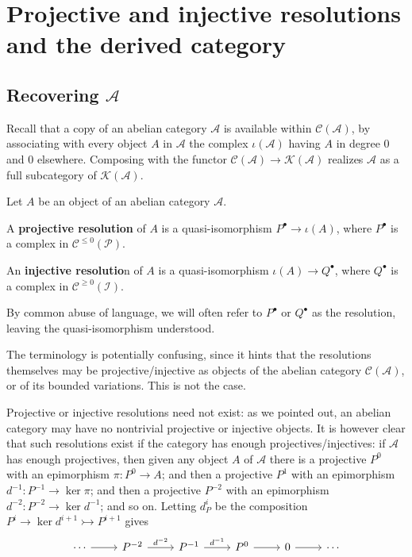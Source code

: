 \section{Projective and injective resolutions and the derived category}
\subsection{Recovering $\mathcal{A}$}
Recall that a copy of an abelian category $\mathcal{A}$ is available within $\mathcal{C}(\mathcal{A})$, by associating with every object $A$ in $\mathcal{A}$ the complex $\iota(\mathcal{A})$ having $A$ in degree $0$ and $0$ elsewhere. Composing with the functor $\mathcal{C}(\mathcal{A})\to\mathcal{K}(\mathcal{A})$ realizes $\mathcal{A}$ as a full subcategory of $\mathcal{K}(\mathcal{A})$.
\begin{definition}
Let $A$ be an object of an abelian category $\mathcal{A}$.\par
A \textbf{projective resolution} of $A$ is a quasi-isomorphism $P^\bullet\to\iota(A)$, where $P^\bullet$ is a
complex in $\mathcal{C}^{\leq0}(\mathcal{P})$.\par
An \textbf{injective resolutio}n of $A$ is a quasi-isomorphism $\iota(A)\to Q^\bullet$, where $Q^\bullet$ is a
complex in $\mathcal{C}^{\geq0}(\mathcal{I})$.
\end{definition}
By common abuse of language, we will often refer to $P^\bullet$ or $Q^\bullet$ as the resolution, leaving the quasi-isomorphism understood.
\begin{remark}
The terminology is potentially confusing, since it hints that the resolutions themselves may be projective/injective as objects of the abelian category $\mathcal{C}(\mathcal{A})$, or of its bounded variations. This is not the case.
\end{remark}
Projective or injective resolutions need not exist: as we pointed out, an abelian category may have no nontrivial projective or injective objects. It is however clear that such resolutions exist if the category has enough projectives/injectives: if $\mathcal{A}$ has enough projectives, then given any object $A$ of $\mathcal{A}$ there is a projective $P^0$ with an epimorphism $\pi:P^0\to A$; and then a projective $P^1$ with an epimorphism $d^{-1}:P^{-1}\to\ker\pi$; and then a projective $P^{-2}$ with an
epimorphism $d^{-2}:P^{-2}\to\ker d^{-1}$; and so on. Letting $d^i_P$ be the composition $P^i\to\ker d^{i+1}\rightarrowtail P^{i+1}$ gives
\[\begin{tikzcd}
\cdots\ar[r]&P^{-2}\ar[r,"d^{-2}"]&P^{-1}\ar[r,"d^{-1}"]&P^0\ar[r]&0\ar[r]&\cdots
\end{tikzcd}\]
